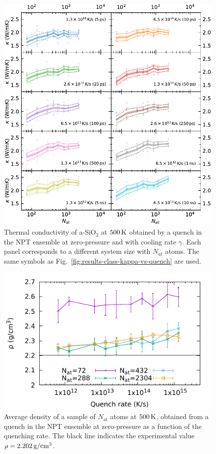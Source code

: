 \begin{figure}[!htb]
    \centering
    \includegraphics[width=\textwidth]{chapters/appendix/figures/Silica_NPT_kappa_NATconv.pdf}
    \caption{Thermal conductivity of a-SiO$_2$ at $500\,\mathrm{K}$ obtained by a quench in the NPT ensemble at zero-pressure and with cooling rate $\gamma$. 
    Each panel corresponds to a different system size with $N_{at}$ atoms.
    The same symbols as Fig.~\ref{fig:results-class-kappa-vs-quench} are used.
    }
    \label{fig:appendix-silica-class-npt-kappa-vs-quench}
\end{figure}

\begin{figure}[!htb]
    \centering
    \includegraphics[width=12cm]{chapters/appendix/figures/dens_NPT_quench.pdf}
    \caption{Average density of a sample of $N_\mathrm{at}$ atoms at $500\,\mathrm{K}$, obtained from a quench in the NPT ensemble at zero-pressure as a function of the quenching rate. The black line indicates the experimental value $\rho=2.202\,\mathrm{g/cm^3}$. }
    \label{fig:appendix-silica-class-npt-density-vs-quench}
\end{figure}